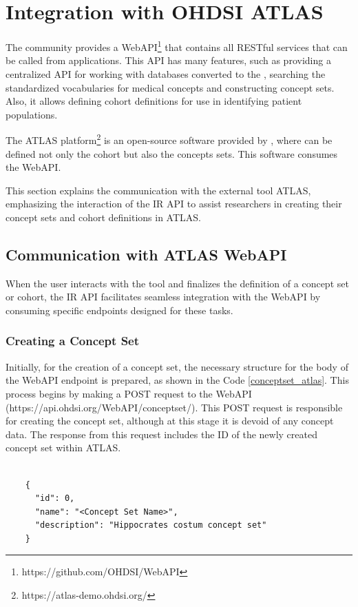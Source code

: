 \section{Integration with OHDSI ATLAS}

The {\ohdsi} community provides a WebAPI\footnote{https://github.com/OHDSI/WebAPI} that contains all {\ohdsi} RESTful services that can be called from {\ohdsi} applications. This API has many features, such as providing a centralized API for working with databases converted to the {\omop}, searching the {\omop} standardized vocabularies for medical concepts and constructing concept sets. Also, it allows defining cohort definitions for use in identifying patient populations.

The ATLAS platform\footnote{https://atlas-demo.ohdsi.org/} is an open-source software provided by {\ohdsi}, where can be defined not only the cohort but also the concepts sets. This software consumes the {\ohdsi} WebAPI.

This section explains the communication with the external tool ATLAS, emphasizing the interaction of the IR API to assist researchers in creating their concept sets and cohort definitions in ATLAS.



\subsection{Communication with ATLAS WebAPI}

When the user interacts with the tool and finalizes the definition of a concept set or cohort, the IR API facilitates seamless integration with the {\ohdsi} WebAPI by consuming specific endpoints designed for these tasks.

\subsubsection{Creating a Concept Set}

Initially, for the creation of a concept set, the necessary structure for the body of the {\ohdsi} WebAPI endpoint is prepared, as shown in the Code \ref{conceptset_atlas}. This process begins by making a POST request to the {\ohdsi} WebAPI (https://api.ohdsi.org/WebAPI/conceptset/). This POST request is responsible for creating the concept set, although at this stage it is devoid of any concept data. The response from this request includes the ID of the newly created concept set within ATLAS.

\begin{listing}[H]
  \begin{verbatim}
      
    { 
      "id": 0, 
      "name": "<Concept Set Name>", 
      "description": "Hippocrates costum concept set"
    }

  \end{verbatim}
  \caption{The body to create the Concept Set in ATLAS.}
  \label{conceptset_atlas}
\end{listing}


